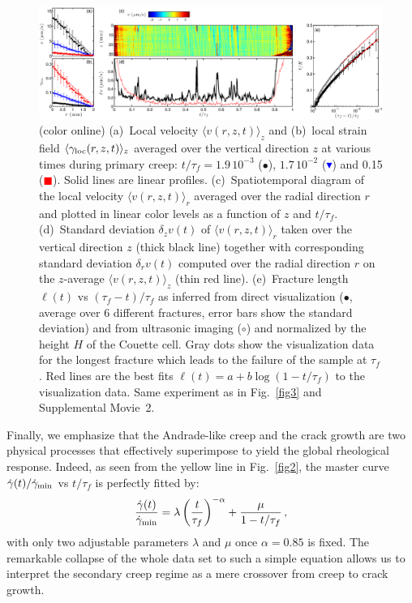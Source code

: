 \documentclass[twocolumn,superscriptaddress,showpacs,preprintnumbers,amsmath,amssymb,prl]{revtex4}
\newcommand\gp{\dot\gamma}
\newcommand\gl{\gamma_{\rm loc}}
\begin{document}
\begin{figure}
\centering
\includegraphics[width=17.5cm,clip]{Fig4.eps}
\caption{(color online) (a)~Local velocity $\langle v(r,z,t)\rangle_z$ and (b)~local strain field $\langle\gl(r,z,t)\rangle_z$ averaged over the vertical direction $z$ at various times during primary creep: $t/\tau_f=1.9\,10^{-3}$ ($\bullet$), $1.7\,10^{-2}$ (\textcolor{blue}{$\blacktriangledown$}) and 0.15 (\textcolor{red}{$\blacksquare$}). Solid lines are linear profiles. (c)~Spatiotemporal diagram of the local velocity $\langle v(r,z,t)\rangle_r$ averaged over the radial direction $r$ and plotted in linear color levels as a function of $z$ and $t/\tau_f$. (d)~Standard deviation $\delta_z v(t)$ of $\langle v(r,z,t)\rangle_r$ taken over the vertical direction $z$ (thick black line) together with corresponding standard deviation $\delta_r v(t)$ computed over the radial direction $r$ on the $z$-average $\langle v(r,z,t)\rangle_z$ (thin red line). (e)~Fracture length $\ell(t)$ vs $(\tau_f-t)/\tau_f$ as inferred from direct visualization ($\bullet$, average over 6 different fractures, error bars show the standard deviation) and from ultrasonic imaging ($\circ$) and normalized by the height $H$ of the Couette cell. Gray dots show the visualization data for the longest fracture which leads to the failure of the sample at $\tau_f$. Red lines are the best fits $\ell(t)=a+b\log(1-t/\tau_f)$ to the visualization data. Same experiment as in Fig.~\ref{fig3} and Supplemental Movie~2.
\label{fig4}}
\end{figure} 

Finally, we emphasize that the Andrade-like creep and the crack growth are two  physical processes that effectively superimpose to yield the global rheological response. Indeed, as seen from the yellow line in Fig.~\ref{fig2}, the master curve $\gp(t)/\gp_{\rm min}$ vs $t/\tau_f$ is perfectly fitted by:
\begin{equation}
\frac{\gp(t)}{\gp_{\rm min}}=\lambda \left(\frac{t}{\tau_f}\right)^{-\alpha}+ \frac{\mu}{1-t/\tau_f}\,,
\label{e.fit}
\end{equation}
with only two adjustable parameters $\lambda$ and $\mu$ once $\alpha=0.85$ is fixed. The remarkable collapse of the whole data set to such a simple equation allows us to interpret the secondary creep regime as a mere crossover from creep to crack growth.
\end{document}
